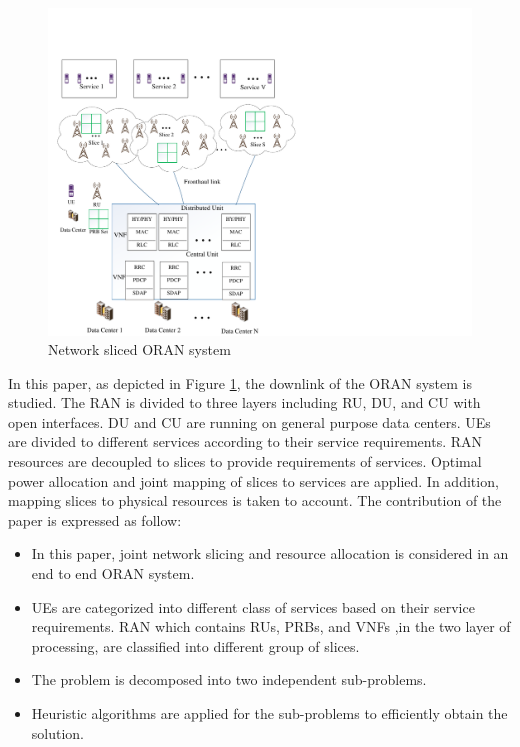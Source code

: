 \documentclass[conference]{IEEEtran}
\begin{document}
\begin{figure}
  \centering
    \includegraphics[scale=0.55]{c7.pdf}
  \caption{Network sliced ORAN system}
  \label{fig:c11}
\end{figure}

In this paper, as  depicted in Figure \ref{fig:c11}, the downlink of the ORAN system is studied. The RAN is divided to three layers including RU, DU, and CU with open interfaces. DU and CU are running on general purpose data centers. UEs are divided to different services according to their service requirements. RAN resources are decoupled to slices to provide requirements of services. Optimal power allocation and joint mapping of slices to services are applied. In addition, mapping slices to physical resources is taken to account. The contribution of the paper is expressed as follow:
\begin{itemize}
\item In this paper, joint network slicing and resource allocation is considered in an end to end ORAN system.
\item UEs are categorized into different class of services based on their service requirements. RAN which contains RUs, PRBs, and VNFs ,in the two layer of processing, are classified into different group of slices.
\item The problem is decomposed into two independent sub-problems.
\item Heuristic algorithms are applied for the sub-problems to efficiently obtain the solution.
\end{itemize}
\end{document}

